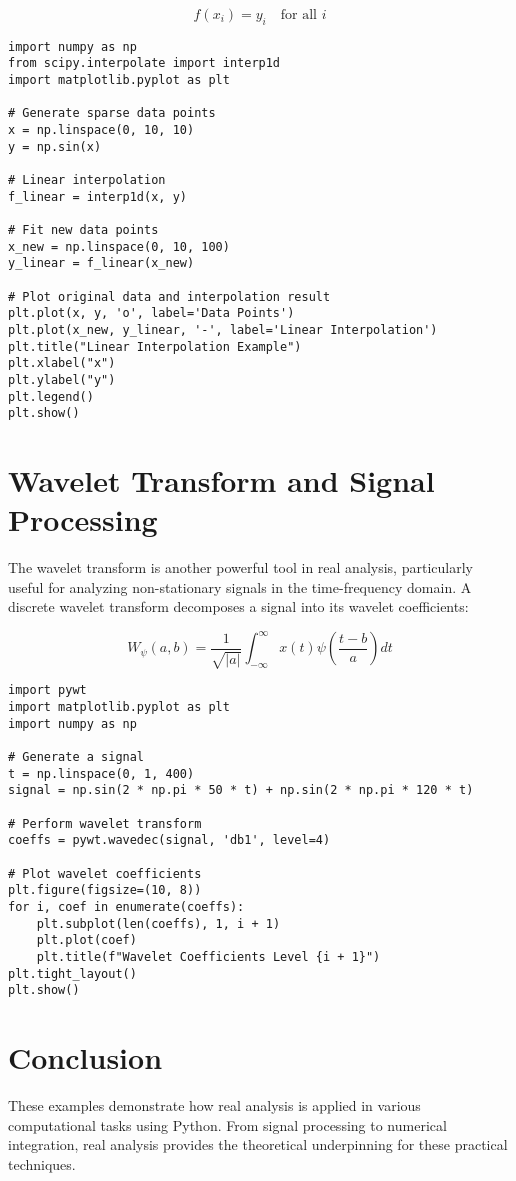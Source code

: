 \documentclass{article}
\begin{document}
\[
f(x_i) = y_i \quad \text{for all } i
\]

\begin{lstlisting}[caption={Data Interpolation Example in Python}, label=code:interpolation]
import numpy as np
from scipy.interpolate import interp1d
import matplotlib.pyplot as plt

# Generate sparse data points
x = np.linspace(0, 10, 10)
y = np.sin(x)

# Linear interpolation
f_linear = interp1d(x, y)

# Fit new data points
x_new = np.linspace(0, 10, 100)
y_linear = f_linear(x_new)

# Plot original data and interpolation result
plt.plot(x, y, 'o', label='Data Points')
plt.plot(x_new, y_linear, '-', label='Linear Interpolation')
plt.title("Linear Interpolation Example")
plt.xlabel("x")
plt.ylabel("y")
plt.legend()
plt.show()
\end{lstlisting}

\section{Wavelet Transform and Signal Processing}
The wavelet transform is another powerful tool in real analysis, particularly useful for analyzing non-stationary signals in the time-frequency domain. A discrete wavelet transform decomposes a signal into its wavelet coefficients:

\[
W_\psi (a,b) = \frac{1}{\sqrt{|a|}} \int_{-\infty}^{\infty} x(t) \psi \left( \frac{t-b}{a} \right) dt
\]

\begin{lstlisting}[caption={Wavelet Transform in Python}, label=code:wavelet]
import pywt
import matplotlib.pyplot as plt
import numpy as np

# Generate a signal
t = np.linspace(0, 1, 400)
signal = np.sin(2 * np.pi * 50 * t) + np.sin(2 * np.pi * 120 * t)

# Perform wavelet transform
coeffs = pywt.wavedec(signal, 'db1', level=4)

# Plot wavelet coefficients
plt.figure(figsize=(10, 8))
for i, coef in enumerate(coeffs):
    plt.subplot(len(coeffs), 1, i + 1)
    plt.plot(coef)
    plt.title(f"Wavelet Coefficients Level {i + 1}")
plt.tight_layout()
plt.show()
\end{lstlisting}

\section{Conclusion}
These examples demonstrate how real analysis is applied in various computational tasks using Python. From signal processing to numerical integration, real analysis provides the theoretical underpinning for these practical techniques.
\end{document}
